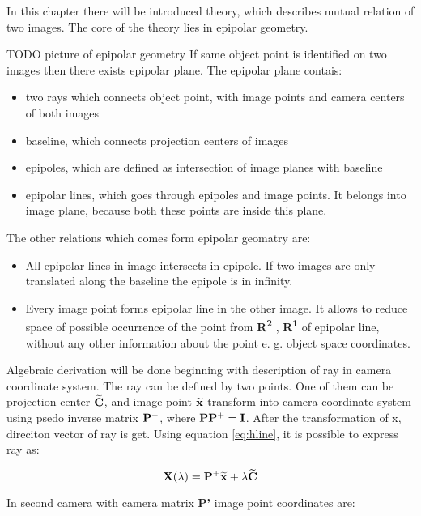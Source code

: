 \documentclass[a4paper,12pt]{report}
\newcommand{\ematr}[1]{
{\bf #1}
}
\newcommand{\ehvect}[1]{
{\bf \widetilde{#1}}
}
\newcommand{\escal}[1]{
{\it #1}
}
\newcommand{\eucl}[1]{
{\bf R\textsuperscript{#1}}
}
\begin{document}
\begin{itemize}
In this chapter there will be introduced theory, which describes mutual relation of two images. 
The core of the theory lies in epipolar geometry.

TODO picture of epipolar geometry
If same object point is identified on two images then there exists epipolar plane.
The epipolar plane contais:

\begin{itemize}
\item two rays which connects object point, with image points and camera centers of both images
\item baseline, which connects projection centers of images
\item epipoles, which are defined as intersection of image planes with baseline
\item epipolar lines, which goes through epipoles and image points. It belongs into image plane, 
      because both these points are inside this plane.  
\end{itemize}


The other relations which comes form epipolar geomatry are:

\begin{itemize}
\item All epipolar lines in image intersects in epipole. If two images are only translated along the baseline 
     the epipole is in infinity.
\item Every image point forms epipolar line in the other image. It allows to reduce space of possible occurrence of the point 
      from \eucl{2}, \eucl{1} of epipolar line, without any other information about the point e. g. object space coordinates. 

\end{itemize}

Algebraic derivation will be done beginning with description of ray in camera coordinate system.
The ray can be defined by two points.
One of them can be projection center $\ehvect{C}$, and 
image point $\ehvect{x}$ transform into camera coordinate system using psedo inverse matrix $\ematr{P}^{+}$, 
where $\ematr{P}\ematr{P}^{+} = \ematr{I}$. After the transformation of x, direciton vector of ray is get.
Using equation \eqref{eq:hline}, it is possible to express ray as:

\begin{equation}
\ematr{X}(\escal{\lambda}) = \ematr{P}^{+}\ehvect{x} + \escal{\lambda}\ehvect{C}
\end{equation}

In second camera with camera matrix \ematr{P'} image point coordinates are:


\end{itemize}
\end{document}
